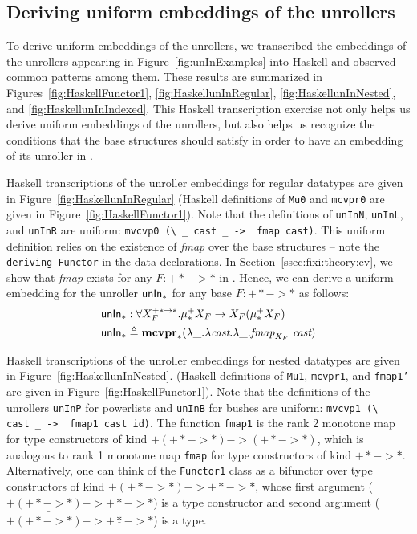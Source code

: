 \subsection{Deriving uniform embeddings of the unrollers}
To derive uniform embeddings of the unrollers, we transcribed the embeddings
of the unrollers appearing in Figure~\ref{fig:unInExamples} into Haskell
and observed common patterns among them. These results are summarized
in Figures~\ref{fig:HaskellFunctor1}, \ref{fig:HaskellunInRegular},
\ref{fig:HaskellunInNested}, and \ref{fig:HaskellunInIndexed}.
This Haskell transcription exercise not only helps us derive
uniform embeddings of the unrollers, but also helps us recognize
the conditions that the base structures should satisfy in order to
have an embedding of its unroller in \Fixi.

Haskell transcriptions of the unroller embeddings for regular datatypes are
given in Figure~\ref{fig:HaskellunInRegular} (Haskell definitions of
\texttt{Mu0} and \texttt{mcvpr0} are given in Figure~\ref{fig:HaskellFunctor1}).
Note that the definitions of \texttt{unInN}, \texttt{unInL}, and \texttt{unInR}
are uniform: \lstinline$mvcvp0 (\ _ cast _ ->  fmap cast)$.
This uniform definition relies on the existence of \textit{fmap} over
the base structures -- note the \lstinline$deriving Functor$
in the data declarations. In Section~\ref{ssec:fixi:theory:cv},
we show that \textit{fmap} exists for any $F:+* -> *$ in \Fixi.
Hence, we can derive a uniform embedding for the unroller $\mathsf{unIn}_{*}$
for any base $F:+* -> *$ as follows:
\begin{align*}
\mathsf{unIn}_{*} &: \forall X_F^{+* -> *}.\mu_{*}^{+}X_F -> X_F(\mu_{*}^{+}X_F) \\
\mathsf{unIn}_{*} &\triangleq \mathbf{mcvpr}_{*} (\lambda\_.\lambda \textit{cast}.\lambda\_.
					\textit{fmap}_{X_F} ~\textit{cast})
\end{align*}

Haskell transcriptions of the unroller embeddings for nested datatypes are
given in Figure~\ref{fig:HaskellunInNested}. (Haskell definitions of
\texttt{Mu1}, \texttt{mcvpr1}, and \texttt{fmap1'} are given
in Figure~\ref{fig:HaskellFunctor1}). Note that the definitions of
the unrollers \texttt{unInP} for powerlists and \texttt{unInB} for bushes
are uniform: \lstinline$mvcvp1 (\ _ cast _ ->  fmap1 cast id)$.
The function \texttt{fmap1} is the rank 2 monotone map for type constructors
of kind $+(+* -> *) -> (+* -> *)$, which is analogous to rank 1 monotone map
\texttt{fmap} for type constructors of kind $+* -> *$. Alternatively, one can
think of the \texttt{Functor1} class as a bifunctor over type constructors of
kind $+(+* -> *) -> +* -> *$, whose first argument
($+\underline{(+* -> *)} -> +* -> *$) is a type constructor
and second argument ($+(+* -> *) -> +\underline{*} -> *$) is a type.

